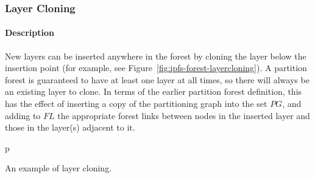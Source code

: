 \subsubsection{Layer Cloning}

\paragraph{Description}

New layers can be inserted anywhere in the forest by cloning the layer below the insertion point (for example, see Figure~\ref{fig:ipfs-forest-layercloning}). A partition forest is guaranteed to have at least one layer at all times, so there will always be an existing layer to clone. In terms of the earlier partition forest definition, this has the effect of inserting a copy of the partitioning graph into the set $\textit{PG}$, and adding to $\textit{FL}$ the appropriate forest links between nodes in the inserted layer and those in the layer(s) adjacent to it.

\begin{stusubfig}{p}
	\\
\caption{An example of layer cloning.}
\label{fig:ipfs-forest-layercloning}
\end{stusubfig}

